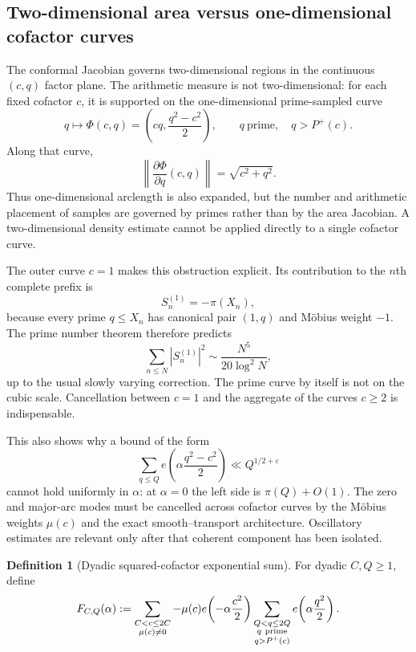\documentclass[11pt]{article}
\theoremstyle{definition}
\newtheorem{definition}[theorem]{Definition}
\theoremstyle{remark}
\newcommand{\eps}{\varepsilon}
\newcommand{\Pplus}{P^{+}}
\newcommand{\1}{\mathbf{1}}
\begin{document}
\subsection{Two-dimensional area versus one-dimensional cofactor curves}
\label{subsec:curve-versus-area}

The conformal Jacobian governs two-dimensional regions in the continuous
$(c,q)$ factor plane.  The arithmetic measure is not two-dimensional:
for each fixed cofactor $c$, it is supported on the one-dimensional
prime-sampled curve
\[
 q\longmapsto
 \Phi(c,q)
 =
 \left(cq,\frac{q^2-c^2}{2}\right),
 \qquad
 q\ \text{prime},\quad q>\Pplus(c).
\]
Along that curve,
\begin{equation}
 \left\lVert\frac{\partial\Phi}{\partial q}(c,q)\right\rVert
 =
 \sqrt{c^2+q^2}.
 \label{eq:curve-length-expansion}
\end{equation}
Thus one-dimensional arclength is also expanded, but the number and
arithmetic placement of samples are governed by primes rather than by
the area Jacobian.  A two-dimensional density estimate cannot be
applied directly to a single cofactor curve.

The outer curve $c=1$ makes this obstruction explicit.  Its contribution
to the $n$th complete prefix is
\begin{equation}
 S_n^{(1)}
 =
 -\pi(X_n),
 \label{eq:prime-curve-prefix}
\end{equation}
because every prime $q\le X_n$ has canonical pair $(1,q)$ and M\"obius
weight $-1$.  The prime number theorem therefore predicts
\begin{equation}
 \sum_{n\le N}|S_n^{(1)}|^2
 \sim
 \frac{N^5}{20\log^2 N},
 \label{eq:prime-curve-asymptotic}
\end{equation}
up to the usual slowly varying correction.  The prime curve by itself
is not on the cubic scale.  Cancellation between $c=1$ and the
aggregate of the curves $c\ge2$ is indispensable.

This also shows why a bound of the form
\[
 \sum_{q\le Q}e\!\left(\alpha\frac{q^2-c^2}{2}\right)
 \ll Q^{1/2+\eps}
\]
cannot hold uniformly in $\alpha$: at $\alpha=0$ the left side is
$\pi(Q)+O(1)$.  The zero and major-arc modes must be cancelled across
cofactor curves by the M\"obius weights $\mu(c)$ and the exact
smooth--transport architecture.  Oscillatory estimates are relevant
only after that coherent component has been isolated.

\begin{definition}[Dyadic squared-cofactor exponential sum]
\label{def:squared-cofactor-sum}
For dyadic $C,Q\ge1$, define
\begin{equation}
 F_{C,Q}(\alpha)
 :=
 \sum_{\substack{C<c\le2C\\\mu(c)\ne0}}
 -\mu(c)e\!\left(-\alpha\frac{c^2}{2}\right)
 \sum_{\substack{Q<q\le2Q\\q\ {\rm prime}\\q>\Pplus(c)}}
 e\!\left(\alpha\frac{q^2}{2}\right).
 \label{eq:F-CQ}
\end{equation}
\end{definition}
\end{document}
